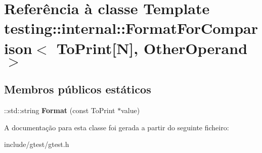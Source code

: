 \hypertarget{classtesting_1_1internal_1_1FormatForComparison_3_01ToPrint[N]_00_01OtherOperand_01_4}{\section{Referência à classe Template testing\-:\-:internal\-:\-:Format\-For\-Comparison$<$ To\-Print\mbox{[}N\mbox{]}, Other\-Operand $>$}
\label{classtesting_1_1internal_1_1FormatForComparison_3_01ToPrint[N]_00_01OtherOperand_01_4}
}
\subsection*{Membros públicos estáticos}
\begin{DoxyCompactItemize}
\item 
\hypertarget{classtesting_1_1internal_1_1FormatForComparison_3_01ToPrint[N]_00_01OtherOperand_01_4_a76c526461c8fa7df75f7b32ab889b9e0}{\-::std\-::string {\bfseries Format} (const To\-Print $\ast$value)}\label{classtesting_1_1internal_1_1FormatForComparison_3_01ToPrint[N]_00_01OtherOperand_01_4_a76c526461c8fa7df75f7b32ab889b9e0}

\end{DoxyCompactItemize}


A documentação para esta classe foi gerada a partir do seguinte ficheiro\-:\begin{DoxyCompactItemize}
\item 
include/gtest/gtest.\-h\end{DoxyCompactItemize}
